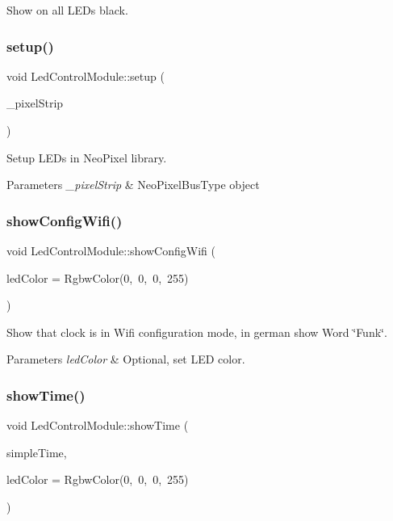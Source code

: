 Show on all L\+E\+Ds black. \mbox{\label{class_led_control_module_ae1eb70e65006f55b30f6a034706829b5}} 
\subsubsection{\texorpdfstring{setup()}{setup()}}
{\footnotesize\ttfamily void Led\+Control\+Module\+::setup (\begin{DoxyParamCaption}\item[{Neo\+Pixel\+Bus\+Type $\ast$}]{\+\_\+pixel\+Strip }\end{DoxyParamCaption})}

Setup L\+E\+Ds in Neo\+Pixel library. 
\begin{DoxyParams}{Parameters}
{\em \+\_\+pixel\+Strip} & Neo\+Pixel\+Bus\+Type object \\
\hline
\end{DoxyParams}
\mbox{\label{class_led_control_module_a70c42e2f9baee807bfdb9fe9bd2f6d8e}} 
\subsubsection{\texorpdfstring{showConfigWifi()}{showConfigWifi()}}
{\footnotesize\ttfamily void Led\+Control\+Module\+::show\+Config\+Wifi (\begin{DoxyParamCaption}\item[{const Rgbw\+Color \&}]{led\+Color = {\ttfamily RgbwColor(0,~0,~0,~255)} }\end{DoxyParamCaption})}

Show that clock is in Wifi configuration mode, in german show Word \char`\"{}\+Funk\char`\"{}. 
\begin{DoxyParams}{Parameters}
{\em led\+Color} & Optional, set L\+ED color. \\
\hline
\end{DoxyParams}
\mbox{\label{class_led_control_module_a873a4c44c95a7da2ca0665b0e69cf392}} 
\subsubsection{\texorpdfstring{showTime()}{showTime()}}
{\footnotesize\ttfamily void Led\+Control\+Module\+::show\+Time (\begin{DoxyParamCaption}\item[{const \mbox{\hyperlink{class_simple_time}{Simple\+Time}} \&}]{simple\+Time,  }\item[{const Rgbw\+Color \&}]{led\+Color = {\ttfamily RgbwColor(0,~0,~0,~255)} }\end{DoxyParamCaption})}

